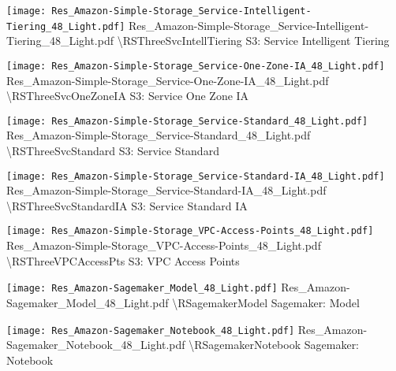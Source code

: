  {\texttt{[image: Res\_Amazon-Simple-Storage\_Service-Intelligent-Tiering\_48\_Light.pdf]}} {Res\_Amazon-Simple-Storage\_Service-Intelligent-Tiering\_48\_Light.pdf} {{\textbackslash}RSThreeSvcIntellTiering} {S3: Service Intelligent Tiering}

 {\texttt{[image: Res\_Amazon-Simple-Storage\_Service-One-Zone-IA\_48\_Light.pdf]}} {Res\_Amazon-Simple-Storage\_Service-One-Zone-IA\_48\_Light.pdf} {{\textbackslash}RSThreeSvcOneZoneIA} {S3: Service One Zone IA}

 {\texttt{[image: Res\_Amazon-Simple-Storage\_Service-Standard\_48\_Light.pdf]}} {Res\_Amazon-Simple-Storage\_Service-Standard\_48\_Light.pdf} {{\textbackslash}RSThreeSvcStandard} {S3: Service Standard}

 {\texttt{[image: Res\_Amazon-Simple-Storage\_Service-Standard-IA\_48\_Light.pdf]}} {Res\_Amazon-Simple-Storage\_Service-Standard-IA\_48\_Light.pdf} {{\textbackslash}RSThreeSvcStandardIA} {S3: Service Standard IA}

 {\texttt{[image: Res\_Amazon-Simple-Storage\_VPC-Access-Points\_48\_Light.pdf]}} {Res\_Amazon-Simple-Storage\_VPC-Access-Points\_48\_Light.pdf} {{\textbackslash}RSThreeVPCAccessPts} {S3: VPC Access Points}

 {\texttt{[image: Res\_Amazon-Sagemaker\_Model\_48\_Light.pdf]}} {Res\_Amazon-Sagemaker\_Model\_48\_Light.pdf} {{\textbackslash}RSagemakerModel} {Sagemaker: Model}

 {\texttt{[image: Res\_Amazon-Sagemaker\_Notebook\_48\_Light.pdf]}} {Res\_Amazon-Sagemaker\_Notebook\_48\_Light.pdf} {{\textbackslash}RSagemakerNotebook} {Sagemaker: Notebook}

